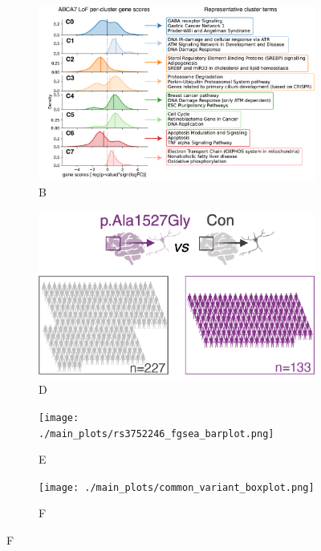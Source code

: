 \begin{figure}[H]
\begin{subfigure}[t]{0.47\textwidth}
    \end{subfigure}
    \begin{subfigure}[t]{0.45\textwidth}
        \caption{B}
        \includegraphics[width=\textwidth]{./main_plots/kl_densities.png}        
    \end{subfigure}
    \begin{subfigure}[t]{0.3\textwidth}
        \caption{D}
        \includegraphics[width=\textwidth]{./main_plots/common_var_cohort_cartoon.png}        
    \end{subfigure}
    \hspace{0.01\textwidth} %
    \begin{subfigure}[t]{0.225\textwidth}
        \caption{E}
        \texttt{[image: ./main\_plots/rs3752246\_fgsea\_barplot.png]}        
    \end{subfigure}
    \begin{subfigure}[t]{0.45\textwidth}
        \caption{F}
        \texttt{[image: ./main\_plots/common\_variant\_boxplot.png]}        

\end{subfigure}
\end{figure}
